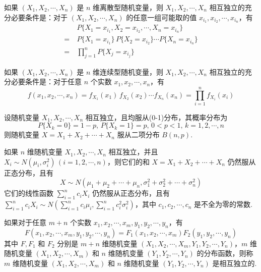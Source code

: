 \begin{conclusion}
    如果 $(X_1,X_2,\cdots,X_n)$ 是 $n$ 维离散型随机变量，则 $X_1,X_2,\cdots,X_n$ 相互独立的充分必要条件是：对于 $(X_1,X_2,\cdots,X_n)$ 的任意一组可能取的值 $x_{i_1}, x_{i_2}, \cdots, x_{i_n}$，有
    $$
    \begin{aligned}
        & P\{X_1 = x_{i_1}, X_2 = x_{i_2}, \cdots, X_n = x_{i_n}\} \\
        = \  & P\{X_1 = x_{i_1}\} \, P\{X_2 = x_{i_2}\} \cdots P\{X_n = x_{i_n}\} \\
        = \  & \prod_{j=1}^n P\{X_j = x_{i_j}\}
    \end{aligned}
    $$
\end{conclusion}

\begin{conclusion}
    如果 $(X_1,X_2,\cdots,X_n)$ 是 $n$ 维连续型随机变量，则 $X_1,X_2,\cdots,X_n$ 相互独立的充分必要条件是：对于任意 $n$ 个实数 $x_1,x_2,\cdots,x_n$，有
    $$
    f(x_1,x_2,\cdots,x_n) = f_{X_1}(x_1) \, f_{X_2}(x_2) \cdots f_{X_n}(x_n) = \prod_{i=1}^n f_{X_i}(x_i)
    $$
\end{conclusion}

\begin{conclusion}
    设随机变量 $X_1,X_2,\cdots,X_n$ 相互独立，且均服从(0-1)分布，其概率分布为
    $$
    P\{ X_k=0 \} = 1-p, \, P\{ X_k=1 \} = p, \, 0<p<1, \, k=1,2,\cdots,n
    $$
    则随机变量 $X = X_1 + X_2 + \cdots + X_n$ 服从二项分布 $B(n,p)$.
\end{conclusion}

\begin{conclusion}
    如果 $n$ 维随机变量 $X_1,X_2,\cdots,X_n$ 相互独立，并且 $X_i \sim N(\mu_i, \sigma_i^2) \, (i=1,2,\cdots,n)$，则它们的和 $X = X_1 + X_2 + \cdots + X_n$ 仍然服从正态分布，且有
    $$
    X \sim N(\mu_1 + \mu_2 + \cdots + \mu_n, \sigma_1^2 + \sigma_2^2 + \cdots + \sigma_n^2)
    $$
    它们的线性函数 $\displaystyle\sum_{i=1}^n c_i X_i$ 仍然服从正态分布，且有 $\displaystyle\sum_{i=1}^n c_i X_i \sim N(\displaystyle\sum_{i=1}^n c_i \mu_i, \displaystyle\sum_{i=1}^n c_i^2 \sigma_i^2)$，其中 $c_1,c_2,\cdots,c_n$ 是不全为零的常数.
\end{conclusion}

\begin{definition}
    如果对于任意 $m+n$ 个实数 $x_1,x_2,\cdots,x_m,y_1,y_2,\cdots,y_n$，有
    $$
    F(x_1,x_2,\cdots,x_m,y_1,y_2,\cdots,y_n) = F_1(x_1,x_2,\cdots,x_m) F_2(y_1,y_2,\cdots,y_n)
    $$
    其中 $F,F_1$ 和 $F_2$ 分别是 $m+n$ 维随机变量 $(X_1,X_2,\cdots,X_m,Y_1,Y_2,\cdots,Y_n)$，$m$ 维随机变量 $(X_1,X_2,\cdots,X_m)$ 和 $n$ 维随机变量 $(Y_1,Y_2,\cdots,Y_n)$ 的分布函数，则称 $m$ 维随机变量 $(X_1,X_2,\cdots,X_m)$ 和 $n$ 维随机变量 $(Y_1,Y_2,\cdots,Y_n)$ 是相互独立的.
\end{definition}

